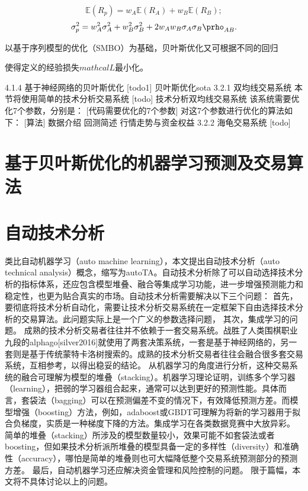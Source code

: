\documentclass[twoside,longtitle]{LZUthesis}
\begin{document}
\[
\mathbb{E}(R_p)=w_A \mathbb{E}(R_A)+w_B\mathbb{E}(R_B);
\]
\[
\sigma^2_p=w_A^2\sigma_A^2+w_B^2\sigma_B^2+2w_A w_B \sigma_A\sigma_B \prho_{AB} .
\]



以基于序列模型的优化（SMBO）为基础，贝叶斯优化又可根据不同的回归








使得定义的经验损失$mathcal{L}$最小化。



4.1.4 基于神经网络的贝叶斯优化
[todo1] 贝叶斯优化sota
3.2.1 双均线交易系统
本节将使用简单的技术分析交易系统
[todo] 技术分析双均线交易系统
该系统需要优化7个参数，分别是：
[代码需要优化的7个参数]
对这7个参数进行优化的算法如下：
[算法]
数据介绍
回测简述
行情走势与资金权益
3.2.2 海龟交易系统
[todo]


\section{基于贝叶斯优化的机器学习预测及交易算法}

\section{自动技术分析}
类比自动机器学习（auto machine learning），本文提出自动技术分析（auto technical analysis）概念，缩写为autoTA。自动技术分析除了可以自动选择技术分析的指标体系，还应包含模型堆叠、融合等集成学习功能，进一步增强预测能力和稳定性，也更为贴合真实的市场。自动技术分析需要解决以下三个问题：
首先，要彻底将技术分析自动化，需要让技术分析交易系统在一定框架下自由选择技术分析的交易算法。此问题实际上是一个广义的参数选择问题，
其次，集成学习的问题。
成熟的技术分析交易者往往并不依赖于一套交易系统。战胜了人类围棋职业九段的alphago[silver2016]就使用了两套决策系统，一套是基于神经网络的，另一套则是基于传统蒙特卡洛树搜索的。成熟的技术分析交易者往往会融合很多套交易系统，互相参考，以得出稳妥的结论。
从机器学习的角度进行分析，这种交易系统的融合可理解为模型的堆叠（stacking）。机器学习理论证明，训练多个学习器（learning），把弱的学习器组合起来，通常可以达到更好的预测性能。具体而言，套袋法（bagging）可以在预测偏差不变的情况下，有效降低预测方差。而模型增强（boosting）方法，例如，adaboost或GBDT可理解为将新的学习器用于拟合负梯度，实质是一种梯度下降的方法。集成学习在各类数据竞赛中大放异彩。
简单的堆叠（stacking）所涉及的模型数量较小，效果可能不如套袋法或者boosting，但如果技术分析派所堆叠的模型具备一定的多样性（diversity）和准确性（accuracy），哪怕是简单的堆叠则也可大幅降低整个交易系统预测部分的预测方差。
最后，自动机器学习还应解决资金管理和风险控制的问题。
限于篇幅，本文将不具体讨论以上的问题。
\end{document}
